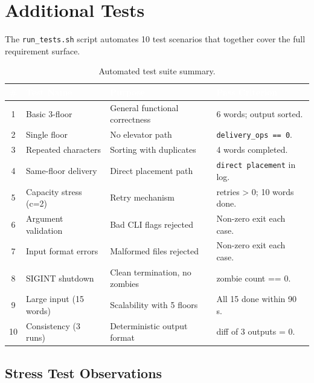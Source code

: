 \documentclass[12pt,a4paper]{article}
\newcommand{\code}[1]{\texttt{\small #1}}
\begin{document}
\section{Additional Tests}

The \code{run\_tests.sh} script automates 10 test scenarios that together cover
the full requirement surface.

\begin{table}[h!]
\centering
\caption{Automated test suite summary.}
\begin{tabularx}{\textwidth}{c l X l}
\toprule
\rowcolor{darkblue}
\textcolor{white}{\#} &
\textcolor{white}{Test Name} &
\textcolor{white}{Purpose} &
\textcolor{white}{Pass Criterion} \\
\midrule
1  & Basic 3-floor        & General functional correctness           & 6 words; output sorted. \\
\rowcolor{rowgray}
2  & Single floor         & No elevator path                         & \code{delivery\_ops == 0}. \\
3  & Repeated characters  & Sorting with duplicates                  & 4 words completed. \\
\rowcolor{rowgray}
4  & Same-floor delivery  & Direct placement path                    & \code{direct placement} in log. \\
5  & Capacity stress (c=2)& Retry mechanism                          & retries > 0; 10 words done. \\
\rowcolor{rowgray}
6  & Argument validation  & Bad CLI flags rejected                   & Non-zero exit each case. \\
7  & Input format errors  & Malformed files rejected                 & Non-zero exit each case. \\
\rowcolor{rowgray}
8  & SIGINT shutdown      & Clean termination, no zombies            & zombie count == 0. \\
9  & Large input (15 words)& Scalability with 5 floors               & All 15 done within 90 s. \\
\rowcolor{rowgray}
10 & Consistency (3 runs) & Deterministic output format              & diff of 3 outputs = 0. \\
\bottomrule
\end{tabularx}
\end{table}

\subsection{Stress Test Observations}
\end{document}
